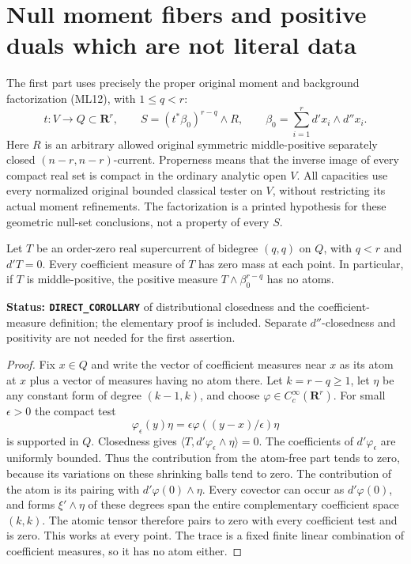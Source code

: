 \section{Null moment fibers and positive duals which are not literal data}
\label{sec:r12-null-fibers-nonliteral-duals}

The first part uses precisely the proper original moment and
background factorization (ML12), with $1\leq q<r$:
\[
 t:V\longrightarrow Q\subset\mathbf R^r,\qquad
 S=(t^*\beta_0)^{r-q}\wedge R,\qquad
 \beta_0=\sum_{i=1}^r d'x_i\wedge d''x_i.
 \tag{NF1}
\]
Here $R$ is an arbitrary allowed original symmetric middle-positive
separately closed $(n-r,n-r)$-current. Properness means that the
inverse image of every compact real set is compact in the ordinary
analytic open $V$. All capacities use every normalized original
bounded classical tester on $V$, without restricting its actual
moment refinements. The factorization is a printed hypothesis for
these geometric null-set conclusions, not a property of every $S$.

\begin{lemma}
\label{lem:r12-closed-current-no-atom}
Let $T$ be an order-zero real supercurrent of bidegree $(q,q)$
on $Q$, with $q<r$ and $d'T=0$. Every coefficient measure of
$T$ has zero mass at each point. In particular, if $T$ is
middle-positive, the positive measure
$T\wedge\beta_0^{r-q}$ has no atoms.
\end{lemma}

\noindent\textbf{Status: \texttt{DIRECT\_COROLLARY}} of
distributional closedness and the coefficient-measure definition;
the elementary proof is included. Separate $d''$-closedness and
positivity are not needed for the first assertion.

\begin{proof}
Fix $x\in Q$ and write the vector of coefficient measures near
$x$ as its atom at $x$ plus a vector of measures having no atom
there. Let $k=r-q\geq1$, let $\eta$ be any constant form of
degree $(k-1,k)$, and choose $\varphi\in C_c^\infty(\mathbf R^r)$.
For small $\epsilon>0$ the compact test
\[
               \varphi_\epsilon(y)\eta
           =\epsilon\varphi((y-x)/\epsilon)\eta
\]
is supported in $Q$. Closedness gives
$\langle T,d'\varphi_\epsilon\wedge\eta\rangle=0$.
The coefficients of $d'\varphi_\epsilon$ are uniformly bounded.
Thus the contribution from the atom-free part tends to zero,
because its variations on these shrinking balls tend to zero.
The contribution of the atom is its pairing with
$d'\varphi(0)\wedge\eta$. Every covector can occur as
$d'\varphi(0)$, and forms $\xi'\wedge\eta$ of these degrees
span the entire complementary coefficient space $(k,k)$.
The atomic tensor therefore pairs to zero with every coefficient
test and is zero. This works at every point.
The trace is a fixed finite linear combination of coefficient
measures, so it has no atom either.
\end{proof}

